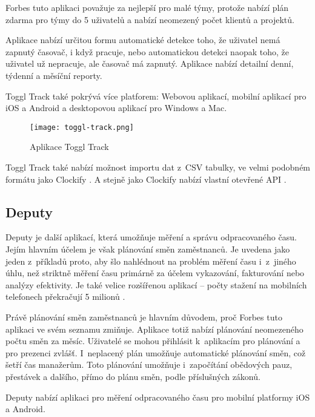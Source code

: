 Forbes tuto aplikaci považuje za nejlepší pro malé týmy, protože nabízí plán zdarma pro týmy do 5 uživatelů a nabízí neomezený počet klientů a projektů. \cite{forbes-tracking-apps-article}

Aplikace nabízí určitou formu automatické detekce toho, že uživatel nemá zapnutý časovač, i když pracuje, nebo automatickou detekci naopak toho, že uživatel už nepracuje, ale časovač má zapnutý. Aplikace nabízí detailní denní, týdenní a měsíční reporty.

Toggl Track také pokrývá více platforem: Webovou aplikací, mobilní aplikací pro iOS a Android a desktopovou aplikací pro Windows a Mac. \cite{toggl-track}

\begin{figure}[h]
	\centering
	\texttt{[image: toggl-track.png]}
	\caption{Aplikace Toggl Track \cite{toggl-track}}
\end{figure}

Toggl Track také nabízí možnost importu dat z~CSV tabulky, ve velmi podobném formátu jako Clockify \cite{toggl-track-import-csv}. A stejně jako Clockify nabízí vlastní otevřené API \cite{toggl-track-api}.

\subsection{Deputy}

Deputy je další aplikací, která umožňuje měření a správu odpracovaného času. Jejím hlavním účelem je však plánování směn zaměstnanců. Je uvedena jako jeden z~příkladů proto, aby šlo nahlédnout na problém měření času i~z~jiného úhlu, než striktně měření času primárně za účelem vykazování, fakturování nebo analýzy efektivity. Je také velice rozšířenou aplikací – počty stažení na mobilních telefonech překračují 5 milionů \cite{deputy-app-magic}.

Právě plánování směn zaměstnanců je hlavním důvodem, proč Forbes tuto aplikaci ve svém seznamu zmiňuje. Aplikace totiž nabízí plánování neomezeného počtu směn za měsíc. Uživatelé se mohou přihlásit k~aplikacím pro plánování a pro prezenci zvlášť. I~neplacený plán umožňuje automatické plánování směn, což šetří čas manažerům. Toto plánování umožňuje i~započítání obědových pauz, přestávek a dalšího, přímo do plánu směn, podle příslušných zákonů.  \cite{forbes-tracking-apps-article}

Deputy nabízí aplikaci pro měření odpracovaného času pro mobilní platformy iOS a Android. 

